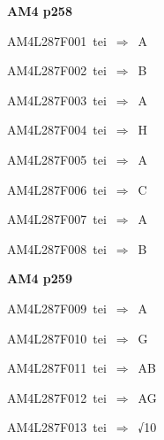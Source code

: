 \par\vfill\eject
{\bf\hfill AM4 p258\hfill\hbox{}}\par\bigskip
{\sixrm AM4L287F001\ {\sixit tei}\ }$\Rightarrow$\ A\par\smallskip
{\sixrm AM4L287F002\ {\sixit tei}\ }$\Rightarrow$\ B\par\smallskip
{\sixrm AM4L287F003\ {\sixit tei}\ }$\Rightarrow$\ A\par\smallskip
{\sixrm AM4L287F004\ {\sixit tei}\ }$\Rightarrow$\ H\par\smallskip
{\sixrm AM4L287F005\ {\sixit tei}\ }$\Rightarrow$\ A\par\smallskip
{\sixrm AM4L287F006\ {\sixit tei}\ }$\Rightarrow$\ C\par\smallskip
{\sixrm AM4L287F007\ {\sixit tei}\ }$\Rightarrow$\ A\par\smallskip
{\sixrm AM4L287F008\ {\sixit tei}\ }$\Rightarrow$\ B\par\smallskip

\par\vfill\eject
{\bf\hfill AM4 p259\hfill\hbox{}}\par\bigskip
{\sixrm AM4L287F009\ {\sixit tei}\ }$\Rightarrow$\ A\par\smallskip
{\sixrm AM4L287F010\ {\sixit tei}\ }$\Rightarrow$\ G\par\smallskip
{\sixrm AM4L287F011\ {\sixit tei}\ }$\Rightarrow$\ AB\par\smallskip
{\sixrm AM4L287F012\ {\sixit tei}\ }$\Rightarrow$\ AG\par\smallskip
{\sixrm AM4L287F013\ {\sixit tei}\ }$\Rightarrow$\ √10\par\smallskip

